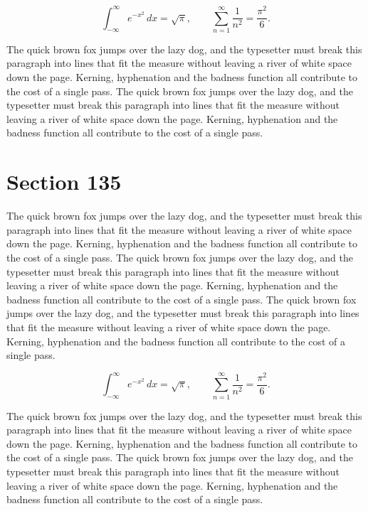 \documentclass{article}
\begin{document}
\begin{equation}
\int_{-\infty}^{\infty} e^{-x^{2}}\,dx = \sqrt{\pi}, \qquad
\sum_{n=1}^{\infty} \frac{1}{n^{2}} = \frac{\pi^{2}}{6}.
\end{equation}

The quick brown fox jumps over the lazy dog, and the typesetter must break this paragraph into lines that fit the measure without leaving a river of white space down the page. Kerning, hyphenation and the badness function all contribute to the cost of a single pass. The quick brown fox jumps over the lazy dog, and the typesetter must break this paragraph into lines that fit the measure without leaving a river of white space down the page. Kerning, hyphenation and the badness function all contribute to the cost of a single pass. 
\section{Section 135}
The quick brown fox jumps over the lazy dog, and the typesetter must break this paragraph into lines that fit the measure without leaving a river of white space down the page. Kerning, hyphenation and the badness function all contribute to the cost of a single pass. The quick brown fox jumps over the lazy dog, and the typesetter must break this paragraph into lines that fit the measure without leaving a river of white space down the page. Kerning, hyphenation and the badness function all contribute to the cost of a single pass. The quick brown fox jumps over the lazy dog, and the typesetter must break this paragraph into lines that fit the measure without leaving a river of white space down the page. Kerning, hyphenation and the badness function all contribute to the cost of a single pass. 

\begin{equation}
\int_{-\infty}^{\infty} e^{-x^{2}}\,dx = \sqrt{\pi}, \qquad
\sum_{n=1}^{\infty} \frac{1}{n^{2}} = \frac{\pi^{2}}{6}.
\end{equation}

The quick brown fox jumps over the lazy dog, and the typesetter must break this paragraph into lines that fit the measure without leaving a river of white space down the page. Kerning, hyphenation and the badness function all contribute to the cost of a single pass. The quick brown fox jumps over the lazy dog, and the typesetter must break this paragraph into lines that fit the measure without leaving a river of white space down the page. Kerning, hyphenation and the badness function all contribute to the cost of a single pass. 
\end{document}
